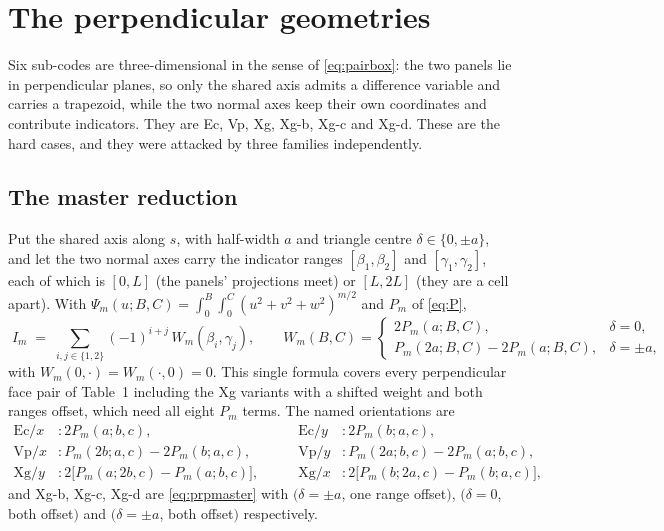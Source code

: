 \documentclass[11pt]{article}
\theoremstyle{remark}
\begin{document}
\section{The perpendicular geometries}
\label{sec:prp}

Six sub-codes are three-dimensional in the sense of \eqref{eq:pairbox}: the two panels lie
in perpendicular planes, so only the shared axis admits a difference variable and carries a
trapezoid, while the two normal axes keep their own coordinates and contribute indicators.
They are Ec, Vp, Xg, Xg-b, Xg-c and Xg-d. These are the hard cases, and they were attacked
by three families independently.

\subsection{The master reduction}
\label{sec:prpasm}

Put the shared axis along $s$, with half-width $a$ and triangle centre
$\delta\in\{0,\pm a\}$, and let the two normal axes carry the indicator ranges
$[\beta_1,\beta_2]$ and $[\gamma_1,\gamma_2]$, each of which is $[0,L]$ (the panels'
projections meet) or $[L,2L]$ (they are a cell apart). With
$\Psi_m(u;B,C) = \int_0^B\!\int_0^C (u^2+v^2+w^2)^{m/2}$ and $P_m$ of \eqref{eq:P},
\begin{equation}
\boxed{\;
I_m \;=\; \sum_{i,j\in\{1,2\}} (-1)^{i+j}\,W_m(\beta_i,\gamma_j),
\qquad
W_m(B,C) = \begin{cases}
2P_m(a;B,C), & \delta = 0,\\[2pt]
P_m(2a;B,C) - 2P_m(a;B,C), & \delta = \pm a,
\end{cases}\;}
\label{eq:prpmaster}
\end{equation}
with $W_m(0,\cdot) = W_m(\cdot,0) = 0$. This single formula covers every perpendicular
face pair of Table~1 including the Xg variants with a shifted weight and both ranges
offset, which need all eight $P_m$ terms. The named orientations are
\begin{equation}
\begin{aligned}
\text{Ec}/x &: 2P_m(a;b,c), &\qquad \text{Ec}/y &: 2P_m(b;a,c),\\
\text{Vp}/x &: P_m(2b;a,c) - 2P_m(b;a,c), &\qquad \text{Vp}/y &: P_m(2a;b,c) - 2P_m(a;b,c),\\
\text{Xg}/y &: 2\bigl[P_m(a;2b,c) - P_m(a;b,c)\bigr], &\qquad \text{Xg}/x &: 2\bigl[P_m(b;2a,c) - P_m(b;a,c)\bigr],
\end{aligned}
\label{eq:prpnamed}
\end{equation}
and Xg-b, Xg-c, Xg-d are \eqref{eq:prpmaster} with $(\delta = \pm a$, one range offset$)$,
$(\delta = 0$, both offset$)$ and $(\delta = \pm a$, both offset$)$ respectively.
\end{document}

